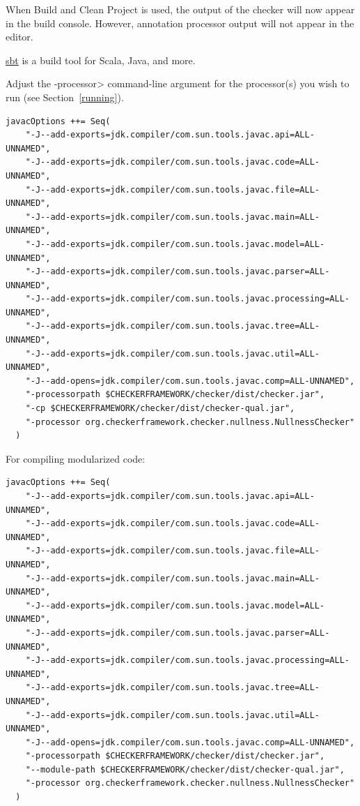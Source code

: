 \begin{enumerate}
When Build and Clean Project is used, the output of the checker will
now appear in the build console. However, annotation processor output
will not appear in the editor.

\end{enumerate}



\href{https://www.scala-sbt.org/}{sbt} is a build tool for
Scala, Java, and more.

Adjust the \<-processor> command-line argument for the processor(s)
you wish to run (see Section~\ref{running}).

\begin{Verbatim}
javacOptions ++= Seq(
    "-J--add-exports=jdk.compiler/com.sun.tools.javac.api=ALL-UNNAMED",
    "-J--add-exports=jdk.compiler/com.sun.tools.javac.code=ALL-UNNAMED",
    "-J--add-exports=jdk.compiler/com.sun.tools.javac.file=ALL-UNNAMED",
    "-J--add-exports=jdk.compiler/com.sun.tools.javac.main=ALL-UNNAMED",
    "-J--add-exports=jdk.compiler/com.sun.tools.javac.model=ALL-UNNAMED",
    "-J--add-exports=jdk.compiler/com.sun.tools.javac.parser=ALL-UNNAMED",
    "-J--add-exports=jdk.compiler/com.sun.tools.javac.processing=ALL-UNNAMED",
    "-J--add-exports=jdk.compiler/com.sun.tools.javac.tree=ALL-UNNAMED",
    "-J--add-exports=jdk.compiler/com.sun.tools.javac.util=ALL-UNNAMED",
    "-J--add-opens=jdk.compiler/com.sun.tools.javac.comp=ALL-UNNAMED",
    "-processorpath $CHECKERFRAMEWORK/checker/dist/checker.jar",
    "-cp $CHECKERFRAMEWORK/checker/dist/checker-qual.jar",
    "-processor org.checkerframework.checker.nullness.NullnessChecker"
  )
\end{Verbatim}



For compiling modularized code:

\begin{Verbatim}
javacOptions ++= Seq(
    "-J--add-exports=jdk.compiler/com.sun.tools.javac.api=ALL-UNNAMED",
    "-J--add-exports=jdk.compiler/com.sun.tools.javac.code=ALL-UNNAMED",
    "-J--add-exports=jdk.compiler/com.sun.tools.javac.file=ALL-UNNAMED",
    "-J--add-exports=jdk.compiler/com.sun.tools.javac.main=ALL-UNNAMED",
    "-J--add-exports=jdk.compiler/com.sun.tools.javac.model=ALL-UNNAMED",
    "-J--add-exports=jdk.compiler/com.sun.tools.javac.parser=ALL-UNNAMED",
    "-J--add-exports=jdk.compiler/com.sun.tools.javac.processing=ALL-UNNAMED",
    "-J--add-exports=jdk.compiler/com.sun.tools.javac.tree=ALL-UNNAMED",
    "-J--add-exports=jdk.compiler/com.sun.tools.javac.util=ALL-UNNAMED",
    "-J--add-opens=jdk.compiler/com.sun.tools.javac.comp=ALL-UNNAMED",
    "-processorpath $CHECKERFRAMEWORK/checker/dist/checker.jar",
    "--module-path $CHECKERFRAMEWORK/checker/dist/checker-qual.jar",
    "-processor org.checkerframework.checker.nullness.NullnessChecker"
  )
\end{Verbatim}


